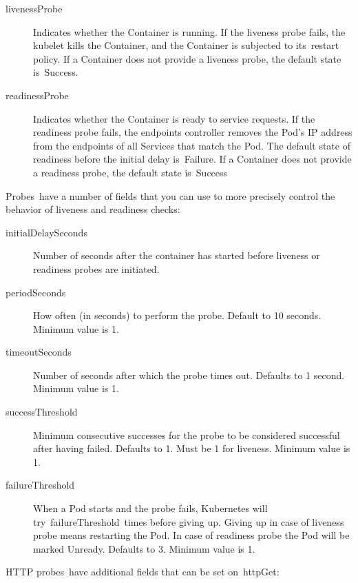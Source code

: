 \begin{description}
\item[livenessProbe] Indicates whether the Container is running. If the liveness probe fails, the kubelet kills the Container, and the Container is subjected to its restart policy. If a Container does not provide a liveness probe, the default state is Success.
\item[readinessProbe] Indicates whether the Container is ready to service requests. If the readiness probe fails, the endpoints controller removes the Pod’s IP address from the endpoints of all Services that match the Pod. The default state of readiness before the initial delay is Failure. If a Container does not provide a readiness probe, the default state is Success
\end{description}

Probes have a number of fields that you can use to more precisely control the behavior of liveness and readiness checks:

\begin{description}
	\item[initialDelaySeconds] Number of seconds after the container has started before liveness or readiness probes are initiated.
	\item[periodSeconds] How often (in seconds) to perform the probe. Default to 10 seconds. Minimum value is 1.
	\item[timeoutSeconds] Number of seconds after which the probe times out. Defaults to 1 second. Minimum value is 1.
	\item[successThreshold] Minimum consecutive successes for the probe to be considered successful after having failed. Defaults to 1. Must be 1 for liveness. Minimum value is 1.
	\item[failureThreshold] When a Pod starts and the probe fails, Kubernetes will try failureThreshold times before giving up. Giving up in case of liveness probe means restarting the Pod. In case of readiness probe the Pod will be marked Unready. Defaults to 3. Minimum value is 1.
\end{description}

HTTP probes have additional fields that can be set on httpGet:


